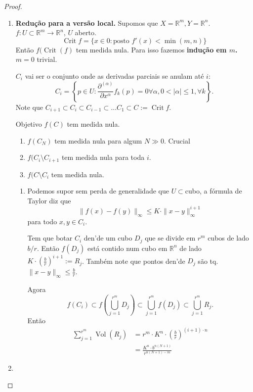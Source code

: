 \begin{proof}\leavevmode
\begin{enumerate}[label=\textbf{Step \arabic*}]
\item \textbf{Redução para a versão local.} Supomos que \(X= \mathbb{R}^{m}, Y=\mathbb{R}^n\). \(f:U \subset \mathbb{R}^m \to \mathbb{R}^n\), \(U\) aberto.
	\[\operatorname{Crit}f= \{x \in 0:\text{posto } f'(x) < \operatorname{min}(m,n)\}\]
Então \(f(\operatorname{Crit}(f)\) tem medida nula. Para isso fazemos \textbf{indução em $m$.} \(m=0\) trivial.

\(C_i\) vai ser o conjunto onde as derivadas parciais se anulam até $i$:
 \[C_i=\left\{ p \in U: \frac{\partial^{(\alpha)}}{\partial x^{\alpha}}f_k(p)=0 \forall \alpha, 0<| \alpha|\leq 1, \forall  k \right\}.\]
 Note que \(C_{i+1}\subset C_i \subset C_{i-1}\subset\ldots C_1\subset C:=\operatorname{Crit}f\).

 \begin{thing7}{Objetivo}\leavevmode
 \(f(C)\) tem medida nula.
 \begin{enumerate}[label=\textbf{Paso \arabic*}]
 \item \(f(C_N)\) tem medida nula para algum  \(N \gg 0\). {\color{8}Crucial}
\item \(f(C_i \setminus C_{i+1}\) tem medida nula para toda $i$.
\item \(f(C\setminus C_i\) tem medida nula.
 \end{enumerate}

\begin{enumerate}[label=\textbf{Paso \arabic*}]
\item Podemos supor sem perda de generalidade que \(U\subset\)cubo, a fórmula de Taylor diz que
	\[\|f(x)-f(y)\|_\infty \leq K \cdot \|x-y\|_\infty^{i+1}\]
para todo \(x, y \in C_i\).

Tem que botar \(C_i\) den'de um cubo \(D_j\) que se divide em \(r^m\) cubos de lado \(b/r\). Então  \(f(D_j)\) está contido num cubo em \(\mathbb{R}^n\) de lado \(K \cdot \left(\frac{b}{r}\right)^{i+1}:=R_j \). Também note que pontos den'de \(D_j\) são tq. \(\|x-y\|_\infty \leq  \frac{b}{r}\).

Agora
\[f(C_i) \subset f\left(\bigcup_{j=1}^{r^m}D_j\right) \subset \bigcup_{j=1}^{r^m}f(D_j)\subset \bigcup_{j=1}^{r^m}R_j.\]
Então
\begin{align*}
\sum_{j=1}^{r^m}\operatorname{Vol}(R_j)&=r^m\cdot K^n\cdot \left(\frac{b}{r}\right)^{(i+1)\cdot n}\\
&= \frac{K^n \cdot b^{n(N+1)}}{r^{n(N+1)-m}}
\end{align*}
\end{enumerate}
 \end{thing7}

\item 
\end{enumerate}

\end{proof}

